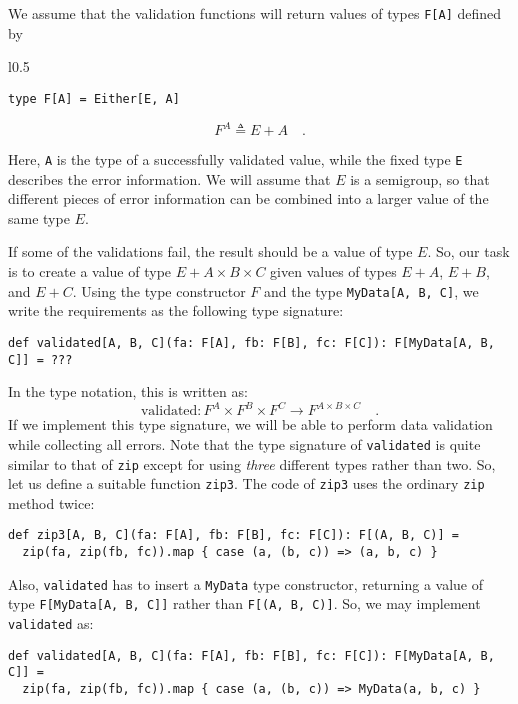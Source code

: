 We assume that the validation functions will return values of types
\lstinline!F[A]! defined by

\begin{wrapfigure}{l}{0.5\columnwidth}%
\vspace{-0.85\baselineskip}
\begin{lstlisting}
type F[A] = Either[E, A]
\end{lstlisting}

\vspace{-0.25\baselineskip}
\end{wrapfigure}%

\noindent \vspace{-0.5\baselineskip}
\[
F^{A}\triangleq E+A\quad.
\]

Here, \lstinline!A! is the type of a successfully validated value,
while the fixed type \lstinline!E! describes the error information.
We will assume that $E$ is a semigroup, so that different pieces
of error information can be combined into a larger value of the same
type $E$.

If some of the validations fail, the result should be a value of type
$E$. So, our task is to create a value of type $E+A\times B\times C$
given values of types $E+A$, $E+B$, and $E+C$. Using the type constructor
$F$ and the type \lstinline!MyData[A, B, C]!, we write the requirements
as the following type signature:
\begin{lstlisting}
def validated[A, B, C](fa: F[A], fb: F[B], fc: F[C]): F[MyData[A, B, C]] = ???
\end{lstlisting}
In the type notation, this is written as:
\[
\text{validated}:F^{A}\times F^{B}\times F^{C}\rightarrow F^{A\times B\times C}\quad.
\]
If we implement this type signature, we will be able to perform data
validation while collecting all errors. Note that the type signature
of \lstinline!validated! is quite similar to that of \lstinline!zip!
except for using \emph{three} different types rather than two. So,
let us define a suitable function \lstinline!zip3!. The code of \lstinline!zip3!
uses the ordinary \lstinline!zip! method twice:
\begin{lstlisting}
def zip3[A, B, C](fa: F[A], fb: F[B], fc: F[C]): F[(A, B, C)] =
  zip(fa, zip(fb, fc)).map { case (a, (b, c)) => (a, b, c) }
\end{lstlisting}
Also, \lstinline!validated! has to insert a \lstinline!MyData! type
constructor, returning a value of type \lstinline!F[MyData[A, B, C]]!
rather than \lstinline!F[(A, B, C)]!. So, we may implement \lstinline!validated!
as:
\begin{lstlisting}
def validated[A, B, C](fa: F[A], fb: F[B], fc: F[C]): F[MyData[A, B, C]] =
  zip(fa, zip(fb, fc)).map { case (a, (b, c)) => MyData(a, b, c) }
\end{lstlisting}

